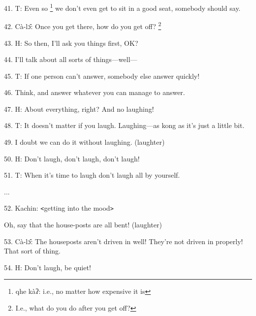 41. T: Even so \footnote{qhe kàʔ: i.e., no matter how expensive it is} we don't even get to sit in a good seat, somebody should say.

42. Cà-lɔ̂: Once you get there, how do you get off? \footnote{I.e., what do you do after you get off?}

43. H: So then, I'll ask you things first, OK?

44. I'll talk about all sorts of things---well---

45. T: If one person can't answer, somebody else answer quickly!

46. Think, and answer whatever you can manage to answer.

47. H: About everything, right?  And no laughing!

48. T: It doesn't matter if you laugh. Laughing---as kong as it's just a little
bit.

49. I doubt we can do it without laughing. (laughter)

50. H: Don't laugh, don't laugh, don't laugh!

51. T: When it's time to laugh don't laugh all by yourself.

...

52. Kachin: \texttt{<}getting into the mood\texttt{>}

Oh, say that the house-posts are all bent! (laughter)

53. Cà-lɔ̂: The houseposts aren't driven in well!  They're not driven in properly!
That sort of thing.

54. H: Don't laugh, be quiet!

